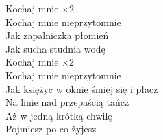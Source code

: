 \documentclass[a5paper, 10pt]{book}
\begin{document}
\begin{minipage}[t]{0.7\textwidth}
\hspace*{5mm}Kochaj mnie  \hspace*{8mm} $\times$2\\
\hspace*{5mm}Kochaj mnie nieprzytomnie\\
\hspace*{5mm}Jak zapalniczka płomień\\
\hspace*{5mm}Jak sucha studnia wodę\\

\hspace*{5mm}Kochaj mnie  \hspace*{8mm} $\times$2\\
\hspace*{5mm}Kochaj mnie nieprzytomnie\\
\hspace*{5mm}Jak księżyc w oknie śmiej się i płacz\\
\hspace*{5mm}Na linie nad przepaścią tańcz\\
\hspace*{5mm}Aż w jedną krótką chwilę\\
\hspace*{5mm}Pojmiesz po co żyjesz\\
\end{minipage}
\end{document}
